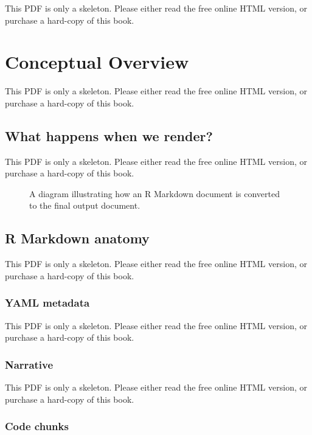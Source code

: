 \documentclass[
  11pt,
]{krantz}
\begin{document}
This PDF is only a skeleton. Please either read the free online HTML version, or purchase a hard-copy of this book.

\chapter{Conceptual Overview}\label{conceptual-overview}

This PDF is only a skeleton. Please either read the free online HTML version, or purchase a hard-copy of this book.

\section{What happens when we render?}\label{rmarkdown-process}

This PDF is only a skeleton. Please either read the free online HTML version, or purchase a hard-copy of this book.

\begin{figure}\caption{A diagram illustrating how an R Markdown document is converted to the final output document.}\end{figure}

\section{R Markdown anatomy}\label{rmarkdown-anatomy}

This PDF is only a skeleton. Please either read the free online HTML version, or purchase a hard-copy of this book.

\subsection{YAML metadata}\label{yaml-metadata}

This PDF is only a skeleton. Please either read the free online HTML version, or purchase a hard-copy of this book.

\subsection{Narrative}\label{narrative}

This PDF is only a skeleton. Please either read the free online HTML version, or purchase a hard-copy of this book.

\subsection{Code chunks}\label{code-chunks}
\end{document}

